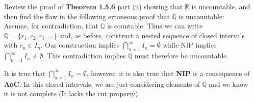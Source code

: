 \documentclass[12pt]{article}
\newcommand{\R}{\mathbb{R}}
\newcommand{\Q}{\mathbb{Q}}
\newenvironment{problem}[2][Problem]{\begin{trivlist}
		\item[\hskip \labelsep {\bfseries #1}\hskip \labelsep {\bfseries #2.}]}{\end{trivlist}}
\newenvironment{solution}[2][Solution]{\begin{trivlist}
		\item[\hskip \labelsep {\bfseries #1}\hskip \labelsep {\bfseries #2.}]}{\end{trivlist}}
\begin{document}
	\begin{problem}{1.5.2}
		Review the proof of \textbf{Theorem 1.5.6} part (ii) showing that $\R$ is uncountable, and then find the flaw in the following erroneous proof that $\Q$ is uncountable:\\
		Assume, for contradiction, that $\Q$ is countable. Thus we can write $\Q = \{r_{1},r_{2},r_{3},\ldots\}$ and, as before, construct a nested sequence of closed intervals with $r_{n} \in I_{n}$. Our construction implies $\bigcap_{n=1}^{\infty} I_{n} = \emptyset$ while NIP implies $\bigcap_{n=1}^{\infty} I_{n} \neq \emptyset$. This contradiction implies $\Q$ must therefore be uncountable.  
		\begin{solution}{1.5.2}
			 It is true that $\bigcap_{n=1}^{\infty} I_{n} = \emptyset$, however, it is also true that \textbf{NIP} is a consequence of \textbf{AoC}. In this closed intervals, we are just considering elements of $\Q$ and we know it is not complete (It lacks the cut property).
		\end{solution}
	\end{problem}
\end{document}
